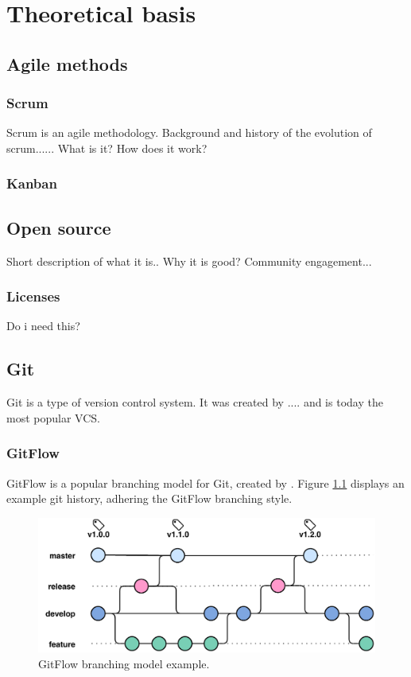 \chapter{Theoretical basis}

\section{Agile methods}
\subsection{Scrum}
Scrum is an agile methodology. 
Background and history of the evolution of scrum......
What is it? How does it work?

\subsection{Kanban}

\section{Open source}
Short description of what it is.. Why it is good?
Community engagement... 
\subsection{Licenses}
Do i need this?

\section{Git}
Git is a type of version control system. It was created by .... and is today the most popular VCS.

\subsection{GitFlow}
GitFlow is a popular branching model for Git, created by \cite{gitflow}. Figure \ref{fig:gitflow} displays an example git history, adhering the GitFlow branching style.
\begin{figure}[h]
    \centering
    \includegraphics[page=1,width=\textwidth]{sections/methodology/figures/gitflow.pdf}
    \caption{GitFlow branching model example.}
    \label{fig:gitflow}
\end{figure}

